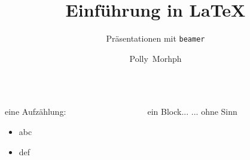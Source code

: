 \documentclass{beamer}
\title{Einf\"uhrung in \LaTeX}
\subtitle{Pr\"asentationen mit \texttt{beamer}}
\author{Polly~Morhph}
\institute{Fakult\"at~f\"ur~Mathematik, TU~Dortmund}
\begin{document}
\begin{frame}
  \maketitle
\end{frame}

\begin{frame}[<+->]
  \begin{columns}[T]
    \begin{column}{0.49\textwidth}
      eine Aufzählung:
      \begin{itemize}
        \item abc
        \item def
      \end{itemize}
    \end{column}
    \begin{column}{0.49\textwidth}
      \begin{block}{ein Block...}
        ... ohne Sinn
      \end{block}
    \end{column}
  \end{columns}
\end{frame}
\end{document}
